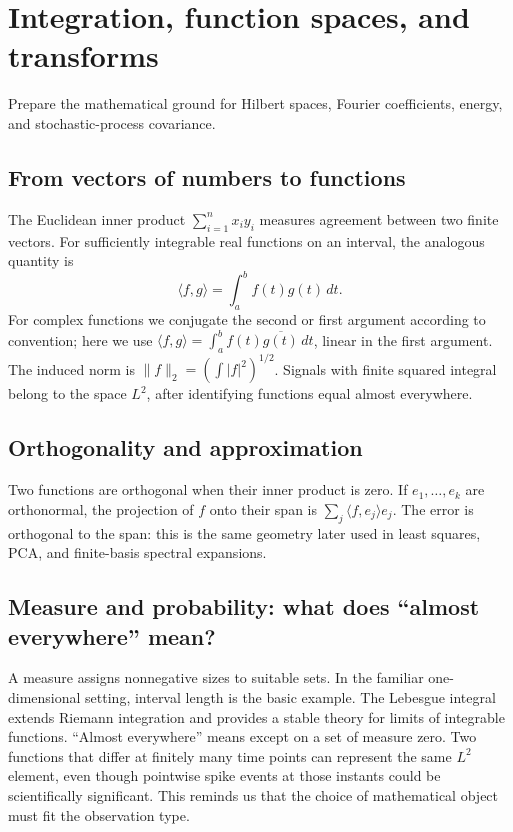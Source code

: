 \chapter{Integration, function spaces, and transforms}\label{ch:functionspaces}
\begin{readergoal}Prepare the mathematical ground for Hilbert spaces, Fourier coefficients, energy, and stochastic-process covariance.\end{readergoal}
\section{From vectors of numbers to functions}
The Euclidean inner product $\sum_{i=1}^n x_iy_i$ measures agreement between two finite vectors. For sufficiently integrable real functions on an interval, the analogous quantity is
\[\langle f,g\rangle=\int_a^b f(t)g(t)\,dt.\]
For complex functions we conjugate the second or first argument according to convention; here we use $\langle f,g\rangle=\int_a^b f(t)\overline{g(t)}\,dt$, linear in the first argument. The induced norm is $\|f\|_2=(\int |f|^2)^{1/2}$. Signals with finite squared integral belong to the space $L^2$, after identifying functions equal almost everywhere.

\section{Orthogonality and approximation}
Two functions are orthogonal when their inner product is zero. If $e_1,\ldots,e_k$ are orthonormal, the projection of $f$ onto their span is $\sum_j\langle f,e_j\rangle e_j$. The error is orthogonal to the span: this is the same geometry later used in least squares, PCA, and finite-basis spectral expansions.

\section{Measure and probability: what does ``almost everywhere'' mean?}
A measure assigns nonnegative sizes to suitable sets. In the familiar one-dimensional setting, interval length is the basic example. The Lebesgue integral extends Riemann integration and provides a stable theory for limits of integrable functions. ``Almost everywhere'' means except on a set of measure zero. Two functions that differ at finitely many time points can represent the same $L^2$ element, even though pointwise spike events at those instants could be scientifically significant. This reminds us that the choice of mathematical object must fit the observation type.

